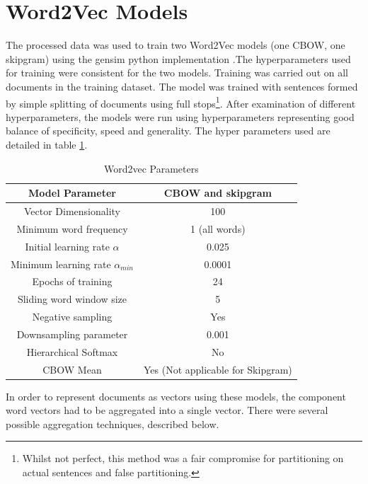 \section{Word2Vec Models}
The processed data was used to train two Word2Vec models (one CBOW, one skipgram) using the gensim python implementation \cite{gensim}.The hyperparameters used for training were consistent for the two models.
Training was carried out on all documents in the training dataset. The model was trained with sentences formed by simple splitting of documents using full stops\footnote{Whilst not perfect, this method was a fair compromise for partitioning on actual sentences and false partitioning.}. After examination of different hyperparameters, the models were run using hyperparameters representing good balance of specificity, speed and generality. The hyper parameters used are detailed in table \ref{tab:hyperparams}.
\begin{table}[h!]
\begin{center}
\caption{Word2vec Parameters}
\label{tab:hyperparams}

\begin{tabular}{||c|c||}
\hline
Model Parameter &CBOW and skipgram\\
\hline
Vector Dimensionality & 100\\
Minimum word frequency & 1 (all words)\\
Initial learning rate $\alpha$ & 0.025 \\
Minimum learning rate $\alpha_{min}$&0.0001\\
Epochs of training & 24\\
Sliding word window size & 5\\
Negative sampling & Yes \\
Downsampling parameter & 0.001\\
Hierarchical Softmax & No\\
CBOW Mean & Yes (Not applicable for Skipgram) \\
\hline
\end{tabular}
\end{center}
\end{table}
In order to represent documents as vectors using these models, the component word vectors had to be aggregated into a single vector. There were several possible aggregation techniques, described below.
